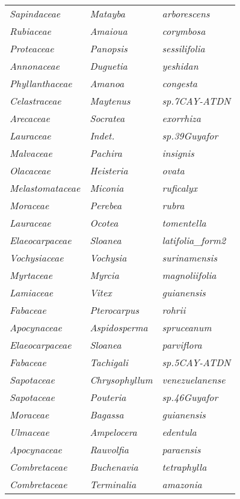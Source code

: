 \documentclass[fleqn,10pt]{ArtEcoFoG} %
\renewenvironment{table}{\begin{table*}}{\end{table*}\ignorespacesafterend}
\begin{document}
\begin{table}
\begin{tabular}[t]{lll}
\addlinespace
\em{Sapindaceae} & \em{Matayba} & \em{arborescens}\\
\em{Rubiaceae} & \em{Amaioua} & \em{corymbosa}\\
\em{Proteaceae} & \em{Panopsis} & \em{sessilifolia}\\
\em{Annonaceae} & \em{Duguetia} & \em{yeshidan}\\
\em{Phyllanthaceae} & \em{Amanoa} & \em{congesta}\\
\addlinespace
\em{Celastraceae} & \em{Maytenus} & \em{sp.7CAY-ATDN}\\
\em{Arecaceae} & \em{Socratea} & \em{exorrhiza}\\
\em{Lauraceae} & \em{Indet.} & \em{sp.39Guyafor}\\
\em{Malvaceae} & \em{Pachira} & \em{insignis}\\
\em{Olacaceae} & \em{Heisteria} & \em{ovata}\\
\addlinespace
\em{Melastomataceae} & \em{Miconia} & \em{ruficalyx}\\
\em{Moraceae} & \em{Perebea} & \em{rubra}\\
\em{Lauraceae} & \em{Ocotea} & \em{tomentella}\\
\em{Elaeocarpaceae} & \em{Sloanea} & \em{latifolia\_form2}\\
\em{Vochysiaceae} & \em{Vochysia} & \em{surinamensis}\\
\addlinespace
\em{Myrtaceae} & \em{Myrcia} & \em{magnoliifolia}\\
\em{Lamiaceae} & \em{Vitex} & \em{guianensis}\\
\em{Fabaceae} & \em{Pterocarpus} & \em{rohrii}\\
\em{Apocynaceae} & \em{Aspidosperma} & \em{spruceanum}\\
\em{Elaeocarpaceae} & \em{Sloanea} & \em{parviflora}\\
\addlinespace
\em{Fabaceae} & \em{Tachigali} & \em{sp.5CAY-ATDN}\\
\em{Sapotaceae} & \em{Chrysophyllum} & \em{venezuelanense}\\
\em{Sapotaceae} & \em{Pouteria} & \em{sp.46Guyafor}\\
\em{Moraceae} & \em{Bagassa} & \em{guianensis}\\
\em{Ulmaceae} & \em{Ampelocera} & \em{edentula}\\
\addlinespace
\em{Apocynaceae} & \em{Rauvolfia} & \em{paraensis}\\
\em{Combretaceae} & \em{Buchenavia} & \em{tetraphylla}\\
\em{Combretaceae} & \em{Terminalia} & \em{amazonia}\\

\end{tabular}
\end{table}
\end{document}
